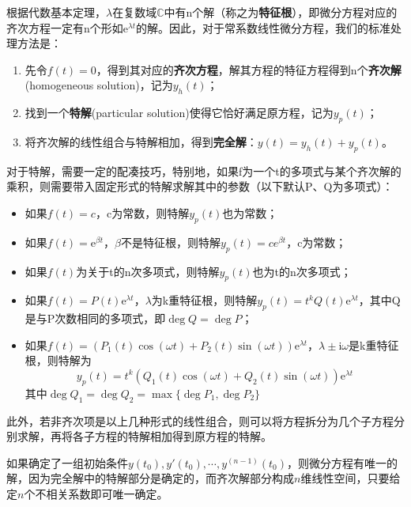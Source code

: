 根据代数基本定理，$\lambda$在复数域$\mathbb{C}$中有n个解（称之为\textbf{特征根}），即微分方程对应的齐次方程一定有n个形如$\mathrm{e}^{\lambda t}$的解。因此，对于常系数线性微分方程，我们的标准处理方法是：
\begin{enumerate}
    \item 先令$f(t)=0$，得到其对应的\textbf{齐次方程}，解其方程的特征方程得到n个\textbf{齐次解}(homogeneous solution)，记为$y_h(t)$；
    \item 找到一个\textbf{特解}(particular solution)使得它恰好满足原方程，记为$y_p(t)$；
    \item 将齐次解的线性组合与特解相加，得到\textbf{完全解}：$y(t)=y_h(t)+y_p(t)$。
\end{enumerate}
对于特解，需要一定的配凑技巧，特别地，如果f为一个t的多项式与某个齐次解的乘积，则需要带入固定形式的特解求解其中的参数（以下默认P、Q为多项式）：\begin{itemize}
    \item 如果$f(t)=c$，c为常数，则特解$y_p(t)$也为常数；
    \item 如果$f(t)=\mathrm{e}^{\beta t}$，$\beta$不是特征根，则特解$y_p(t)=ce^{\beta t}$，c为常数；
    \item 如果$f(t)$为关于t的n次多项式，则特解$y_p(t)$也为t的n次多项式；
    \item 如果$f(t)=P(t)\mathrm{e}^{\lambda t}$，$\lambda$为k重特征根，则特解$y_p(t)=t^k Q(t)\mathrm{e}^{\lambda t}$，其中Q是与P次数相同的多项式，即$\deg Q=\deg P$；
    \item 如果$f(t)=(P_1(t)\cos(\omega t)+P_2(t)\sin(\omega t))\mathrm{e}^{\lambda t}$，$\lambda\pm \mathrm{i}\omega$是k重特征根，则特解为
    $$y_p(t)=t^k(Q_1(t)\cos(\omega t)+Q_2(t)\sin(\omega t))\mathrm{e}^{\lambda t}$$
    其中$\deg Q_1=\deg Q_2=\max\{\deg P_1,\deg P_2\}$
\end{itemize}
此外，若非齐次项是以上几种形式的线性组合，则可以将方程拆分为几个子方程分别求解，再将各子方程的特解相加得到原方程的特解。

如果确定了一组初始条件$y(t_0),y'(t_0),\cdots,y^{(n-1)}(t_0)$，则微分方程有唯一的解，因为完全解中的特解部分是确定的，而齐次解部分构成$n$维线性空间，只要给定$n$个不相关系数即可唯一确定。

